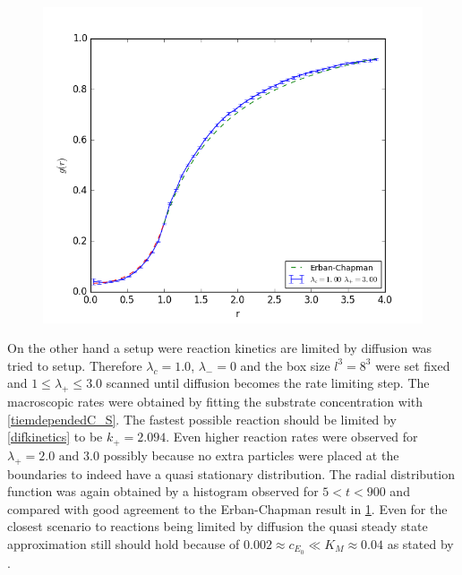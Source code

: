 \documentclass[
  a4paper,BCOR10mm,oneside,
  headsepline,footsepline,%
  fleqn,openbib
]{scrbook}
\begin{document}
\begin{figure}
  \centering
  \includegraphics[width=\textwidth]{./data/limit-radial.png}
  \captionsetup{width=\linewidth}
  \label{fig:diffusion1_limit-radial}
\end{figure}
On the other hand a setup were reaction kinetics are limited by diffusion was tried to setup. Therefore  $\lambda_c=1.0$, $\lambda_-=0$ and the box size $l^3=8^3$ were set fixed and  $1\leq\lambda_+\leq3.0$ scanned until diffusion becomes the rate limiting step. The macroscopic rates were obtained by fitting the substrate concentration with \cref{tiemdependedC_S}. The fastest possible reaction should be limited by \cref{difkinetics} to be $k_+=2.094$. Even higher reaction rates were observed for $\lambda_+=2.0 \text{ and }3.0$ possibly because no extra particles were placed at the boundaries to indeed have a quasi stationary distribution. The radial distribution function was again obtained by a histogram observed for $5<t<900$ and compared with good agreement to the Erban-Chapman result in \cref{fig:diffusion1_limit-radial}. Even for the closest scenario to reactions being limited by diffusion the quasi steady state approximation still should hold because of $0.002 \approx c_{E_0}\ll K_M\approx 0.04$  as stated by \cite{Palsson1987}. 
\end{document}
